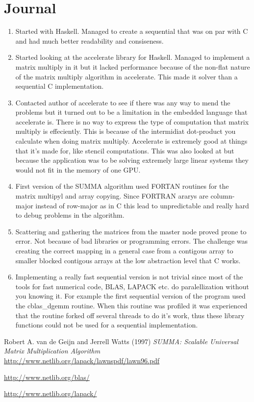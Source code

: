\documentclass{article}
\begin{document}
\section{Journal}
\begin{enumerate}
	\item Started with Haskell. Managed to create a sequential that was on par with C and had much better readability and consiseness.
	\item Started looking at the accelerate library for Haskell. Managed to implement a matrix multiply in it but it lacked performance because of the non-flat nature of the matrix multiply algorithm in accelerate. This made it solver than a sequential C implementation.
	\item Contacted author of accelerate to see if there was any way to mend the problems but it turned out to be a limitation in the embedded language that accelerate is. There is no way to express the type of computation that matrix multiply is effeciently. This is because of the intermidiat dot-product you calculate when doing matrix multiply. Accelerate is extremely good at things that it's made for, like stencil computations. This was also looked at but because the application was to be solving extremely large linear systems they would not fit in the memory of one GPU.
	\item First version of the SUMMA algorithm used FORTAN routines for the matrix multipyl and array copying. Since FORTRAN ararys are column-major instead of row-major as in C this lead to unpredictable and really hard to debug problems in the algorithm.
	\item Scattering and gathering the matrices from the master node proved prone to error. Not because of bad libraries or programming errors. The challenge was creating the correct mapping in a general case from a contigous array to smaller blocked contigous arrays at the low abstraction level that C works.
	\item Implementing a really fast sequential version is not trivial since most of the tools for fast numerical code, BLAS, LAPACK etc. do paralellization without you knowing it. For example the first sequential version of the program used the cblas\_dgemm routine. When this routine was profiled it was experienced that the routine forked off several threads to do it's work, thus these library functions could not be used for a sequential implementation.
\end{enumerate}



\begin{thebibliography}{9}

  Robert A. van de Geijn and Jerrell Watts (1997)
  \emph{SUMMA: Scalable Universal Matrix Multiplication Algorithm}
  \url{http://www.netlib.org/lapack/lawnspdf/lawn96.pdf}

  \url{http://www.netlib.org/blas/}

  \url{http://www.netlib.org/lapack/}

\end{thebibliography}
\end{document}

